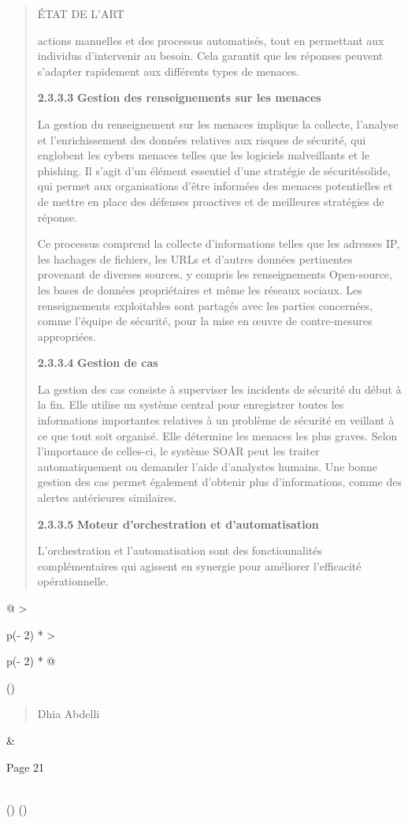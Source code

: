 \documentclass[
]{article}
\begin{document}
\begin{quote}
ÉTAT DE L'ART

actions manuelles et des processus automatisés, tout en permettant aux
individus d'intervenir au besoin. Cela garantit que les réponses peuvent
s'adapter rapidement aux différents types de menaces.

\textbf{2.3.3.3} \textbf{Gestion des renseignements sur les menaces}

La gestion du renseignement sur les menaces implique la collecte,
l'analyse et l'enrichissement des données relatives aux risques de
sécurité, qui englobent les cybers menaces telles que les logiciels
malveillants et le phishing. Il s'agit d'un élément essentiel d'une
stratégie de sécuritésolide, qui permet aux organisations d'être
informées des menaces potentielles et de mettre en place des défenses
proactives et de meilleures stratégies de réponse.

Ce processus comprend la collecte d'informations telles que les adresses
IP, les hachages de fichiers, les URLs et d'autres données pertinentes
provenant de diverses sources, y compris les renseignements Open-source,
les bases de données propriétaires et même les réseaux sociaux. Les
renseignements exploitables sont partagés avec les parties concernées,
comme l'équipe de sécurité, pour la mise en œuvre de contre-mesures
appropriées.

\textbf{2.3.3.4} \textbf{Gestion de cas}

La gestion des cas consiste à superviser les incidents de sécurité du
début à la fin. Elle utilise un système central pour enregistrer toutes
les informations importantes relatives à un problème de sécurité en
veillant à ce que tout soit organisé. Elle détermine les menaces les
plus graves. Selon l'importance de celles-ci, le système SOAR peut les
traiter automatiquement ou demander l'aide d'analystes humains. Une
bonne gestion des cas permet également d'obtenir plus d'informations,
comme des alertes antérieures similaires.

\textbf{2.3.3.5} \textbf{Moteur d'orchestration et d'automatisation}

L'orchestration et l'automatisation sont des fonctionnalités
complémentaires qui agissent en synergie pour améliorer l'efficacité
opérationnelle.
\end{quote}

\begin{longtable}[]{@{}
  >{\raggedright\arraybackslash}p{(\columnwidth - 2\tabcolsep) * }
  >{\raggedright\arraybackslash}p{(\columnwidth - 2\tabcolsep) * }@{}}
\toprule()
\begin{minipage}[b]{\linewidth}\raggedright
\begin{quote}
Dhia Abdelli
\end{quote}
\end{minipage} & \begin{minipage}[b]{\linewidth}\raggedright
Page 21
\end{minipage} \\
\midrule()
\endhead
\bottomrule()
\end{longtable}
\end{document}
